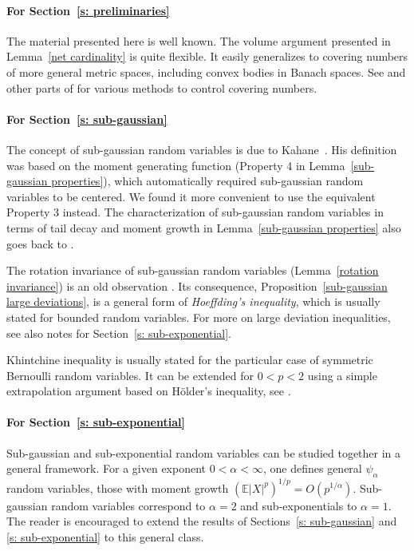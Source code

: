 \documentclass[10pt, openany]{book}
\theoremstyle{remark}
\def \E {\mathbb{E}}
\def \a {\alpha}
\begin{document}
\paragraph{For Section~\ref{s: preliminaries}}

The material presented here is well known. 
The volume argument presented in Lemma~\ref{net cardinality} is quite flexible. 
It easily generalizes to covering numbers of more general metric spaces, including convex bodies
in Banach spaces. See \cite[Lemma 4.16]{Pisier volume} and other parts of \cite{Pisier volume} for various 
methods to control covering numbers. 


\paragraph{For Section~\ref{s: sub-gaussian}}

The concept of sub-gaussian random variables is due to Kahane~\cite{Kahane}.
His definition was based on the moment generating function 
(Property 4 in Lemma~\ref{sub-gaussian properties}),
which automatically required sub-gaussian random variables to be centered. 
We found it more convenient to use the equivalent Property 3 instead. 
The characterization of sub-gaussian random variables in terms of tail decay and moment growth
in Lemma~\ref{sub-gaussian properties} also goes back to \cite{Kahane}.

The rotation invariance of sub-gaussian random variables (Lemma~\ref{rotation invariance}) 
is an old observation \cite{BuKo}. Its consequence, Proposition~\ref{sub-gaussian large deviations},
is a general form of {\em Hoeffding's inequality}, which is usually stated for bounded random variables.
For more on large deviation inequalities, see also notes for Section~\ref{s: sub-exponential}.

Khintchine inequality is usually stated for the particular case of symmetric Bernoulli random variables. 
It can be extended for $0<p<2$ using a simple extrapolation argument based on H\"older's inequality,
see \cite[Lemma~4.1]{Ledoux-Talagrand}.


\paragraph{For Section~\ref{s: sub-exponential}}

Sub-gaussian and sub-exponential random variables can be studied together in a general framework. 
For a given exponent $0 < \alpha < \infty$, 
one defines general $\psi_\alpha$ random variables, 
those with moment growth $(\E |X|^p)^{1/p} = O(p^{1/\a})$. 
Sub-gaussian random variables correspond to $\a = 2$ and sub-exponentials 
to $\a = 1$. The reader is encouraged to extend 
the results of Sections~\ref{s: sub-gaussian} and \ref{s: sub-exponential} to this general class. 
\end{document}
